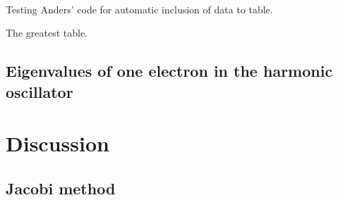 \documentclass[a4paper, fontsize=11pt]{article}
\begin{document}
\paragraph{}
Testing Anders' code for automatic inclusion of data to table.
\begin{table}[h!tb]
    \centering
    \caption{The greatest table.}
\end{table}



\subsection{Eigenvalues of one electron in the harmonic oscillator}







\section{Discussion}
\subsection{Jacobi method}

 





\end{document}
